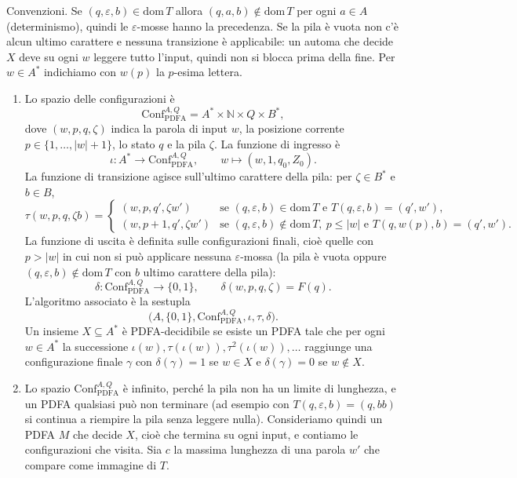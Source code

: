 \begin{sol}
Convenzioni. Se $(q,\varepsilon,b)\in\mathrm{dom}\,T$ allora $(q,a,b)\notin\mathrm{dom}\,T$ per ogni $a\in A$ (determinismo), quindi le $\varepsilon$-mosse hanno la precedenza. Se la pila è vuota non c'è alcun ultimo carattere e nessuna transizione è applicabile: un automa che decide $X$ deve su ogni $w$ leggere tutto l'input, quindi non si blocca prima della fine. Per $w\in A^*$ indichiamo con $w(p)$ la $p$-esima lettera.
\renewcommand{\labelenumi}{\alph{enumi})}
\ 
\begin{enumerate}
\item Lo spazio delle configurazioni è
\[
\mathrm{Conf}_{\mathrm{PDFA}}^{A,Q}=A^*\times\mathbb N\times Q\times B^*,
\]
dove $(w,p,q,\zeta)$ indica la parola di input $w$, la posizione corrente $p\in\{1,\dots,|w|+1\}$, lo stato $q$ e la pila $\zeta$. La funzione di ingresso è
\[
\iota:A^*\to\mathrm{Conf}_{\mathrm{PDFA}}^{A,Q},\qquad w\longmapsto(w,1,q_0,Z_0).
\]
La funzione di transizione agisce sull'ultimo carattere della pila: per $\zeta\in B^*$ e $b\in B$,
\[
\tau(w,p,q,\zeta b)=
\begin{cases}
(w,p,q',\zeta w') & \text{se }(q,\varepsilon,b)\in\mathrm{dom}\,T\text{ e }T(q,\varepsilon,b)=(q',w'),\\[2pt]
(w,p+1,q',\zeta w') & \text{se }(q,\varepsilon,b)\notin\mathrm{dom}\,T,\ p\leq|w|\text{ e }T(q,w(p),b)=(q',w').
\end{cases}
\]
La funzione di uscita è definita sulle configurazioni finali, cioè quelle con $p>|w|$ in cui non si può applicare nessuna $\varepsilon$-mossa (la pila è vuota oppure $(q,\varepsilon,b)\notin\mathrm{dom}\,T$ con $b$ ultimo carattere della pila):
\[
\delta:\mathrm{Conf}_{\mathrm{PDFA}}^{A,Q}\to\{0,1\},\qquad \delta(w,p,q,\zeta)=F(q).
\]
L'algoritmo associato è la sestupla
\[
\bigl(A,\{0,1\},\mathrm{Conf}_{\mathrm{PDFA}}^{A,Q},\iota,\tau,\delta\bigr).
\]
Un insieme $X\subseteq A^*$ è PDFA-decidibile se esiste un PDFA tale che per ogni $w\in A^*$ la successione $\iota(w),\tau(\iota(w)),\tau^2(\iota(w)),\dots$ raggiunge una configurazione finale $\gamma$ con $\delta(\gamma)=1$ se $w\in X$ e $\delta(\gamma)=0$ se $w\notin X$.

\item Lo spazio $\mathrm{Conf}_{\mathrm{PDFA}}^{A,Q}$ è infinito, perché la pila non ha un limite di lunghezza, e un PDFA qualsiasi può non terminare (ad esempio con $T(q,\varepsilon,b)=(q,bb)$ si continua a riempire la pila senza leggere nulla). Consideriamo quindi un PDFA $M$ che decide $X$, cioè che termina su ogni input, e contiamo le configurazioni che visita. Sia $c$ la massima lunghezza di una parola $w'$ che compare come immagine di $T$.


\end{enumerate}
\end{sol}
